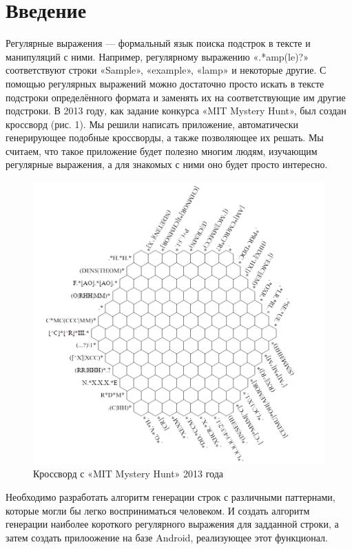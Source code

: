 \documentclass[12pt]{article}
\begin{document}
\section{Введение}
Регулярные выражения — формальный язык поиска подстрок в тексте и манипуляций с ними. Например, регулярному выражению «.*amp(le)?» соответствуют строки «Sample», «example», «lamp» и некоторые другие. С помощью регулярных выражений можно достаточно просто искать в тексте подстроки определённого формата и заменять их на соответствующие им другие подстроки. В 2013 году, как задание конкурса «MIT Mystery Hunt», был создан кроссворд (рис. 1). Мы решили написать приложение, автоматически генерирующее подобные кроссворды, а также позволяющее их решать. Мы считаем, что такое приложение будет полезно многим людям, изучающим регулярные выражения, а для знакомых с ними оно будет просто интересно.
\begin{figure}[ht!]
    \includegraphics[width=1.0\textwidth]{MITHexagon.png}
    \caption{Кроссворд с «MIT Mystery Hunt» 2013 года}
\end{figure}

    \newpage %
     Необходимо разработать алгоритм генерации строк с различными паттернами, которые могли бы легко восприниматься человеком.
     И создать алгоритм генерации наиболее короткого регулярного выражения для задданной строки, а затем создать прилоожение на базе Android, реализующее этот функционал.
\end{document}
